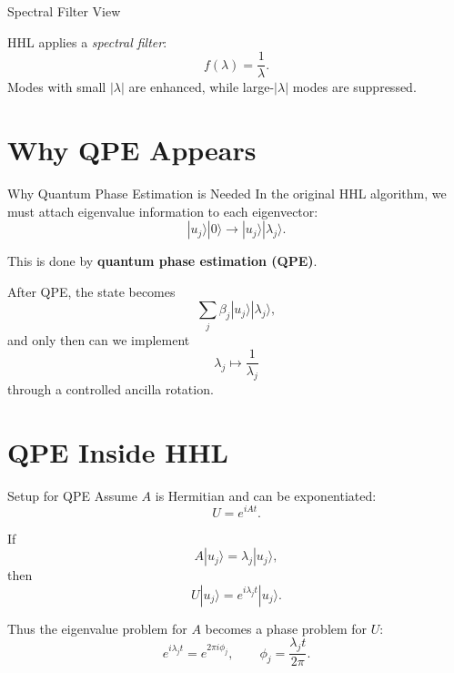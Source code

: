 \documentclass{beamer}
\begin{document}

\begin{frame}{Spectral Filter View}
\centering
{}

\vspace{0.3cm}
HHL applies a \emph{spectral filter}:
\[
f(\lambda)=\frac{1}{\lambda}.
\]
Modes with small \(|\lambda|\) are enhanced, while large-\(|\lambda|\) modes are suppressed.
\end{frame}

\section{Why QPE Appears}

\begin{frame}{Why Quantum Phase Estimation is Needed}
In the original HHL algorithm, we must attach eigenvalue information to each eigenvector:
\[
|u_j\rangle |0\rangle
\longrightarrow
|u_j\rangle |\lambda_j\rangle.
\]

This is done by \textbf{quantum phase estimation (QPE)}.

After QPE, the state becomes
\[
\sum_j \beta_j |u_j\rangle |\lambda_j\rangle,
\]
and only then can we implement
\[
\lambda_j \mapsto \frac{1}{\lambda_j}
\]
through a controlled ancilla rotation.
\end{frame}

\section{QPE Inside HHL}

\begin{frame}{Setup for QPE}
Assume \(A\) is Hermitian and can be exponentiated:
\[
U = e^{iAt}.
\]

If
\[
A|u_j\rangle = \lambda_j |u_j\rangle,
\]
then
\[
U|u_j\rangle = e^{i\lambda_j t}|u_j\rangle.
\]

Thus the eigenvalue problem for \(A\) becomes a phase problem for \(U\):
\[
e^{i\lambda_j t} = e^{2\pi i \phi_j},
\qquad
\phi_j = \frac{\lambda_j t}{2\pi}.
\]
\end{frame}
\end{document}
